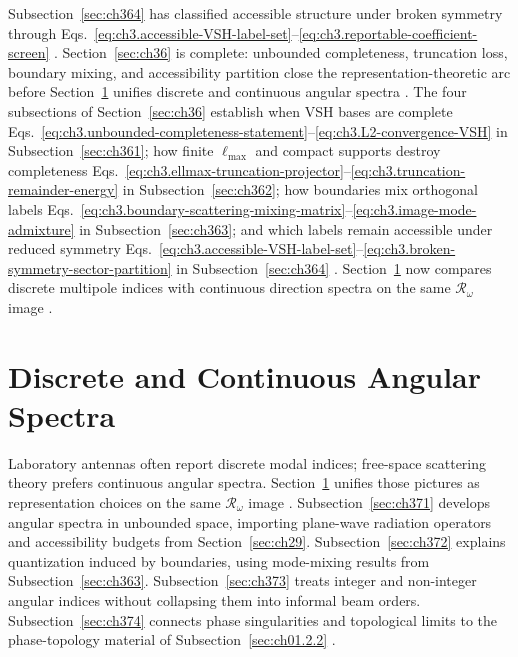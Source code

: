 Subsection~\ref{sec:ch364} has classified accessible structure under broken symmetry through
Eqs.~\eqref{eq:ch3.accessible-VSH-label-set}--\eqref{eq:ch3.reportable-coefficient-screen}
\cite{harrington2001}. Section~\ref{sec:ch36} is complete: unbounded completeness,
truncation loss, boundary mixing, and accessibility partition close the representation-theoretic arc before
Section~\ref{sec:ch37} unifies discrete and continuous angular spectra \cite{hansen1988}.
The four subsections of Section~\ref{sec:ch36} establish when VSH bases are complete
Eqs.~\eqref{eq:ch3.unbounded-completeness-statement}--\eqref{eq:ch3.L2-convergence-VSH} in Subsection~\ref{sec:ch361};
how finite \(\ell_{\max}\) and compact supports destroy completeness
Eqs.~\eqref{eq:ch3.ellmax-truncation-projector}--\eqref{eq:ch3.truncation-remainder-energy} in Subsection~\ref{sec:ch362};
how boundaries mix orthogonal labels Eqs.~\eqref{eq:ch3.boundary-scattering-mixing-matrix}--\eqref{eq:ch3.image-mode-admixture}
in Subsection~\ref{sec:ch363}; and which labels remain accessible under reduced symmetry
Eqs.~\eqref{eq:ch3.accessible-VSH-label-set}--\eqref{eq:ch3.broken-symmetry-sector-partition} in
Subsection~\ref{sec:ch364} \cite{stratton1941}. Section~\ref{sec:ch37} now compares
discrete multipole indices with continuous direction spectra on the same \(\mathcal{R}_\omega\) image
\cite{hansen1988}.
\section{Discrete and Continuous Angular Spectra}
\label{sec:ch37}
Laboratory antennas often report discrete modal indices; free-space scattering theory prefers continuous
angular spectra. Section~\ref{sec:ch37} unifies those pictures as representation choices on the same
\(\mathcal{R}_\omega\) image \cite{jackson1999}. Subsection~\ref{sec:ch371} develops angular
spectra in unbounded space, importing plane-wave radiation operators and accessibility budgets from
Section~\ref{sec:ch29}. Subsection~\ref{sec:ch372} explains quantization induced by boundaries, using
mode-mixing results from Subsection~\ref{sec:ch363}. Subsection~\ref{sec:ch373} treats integer and
non-integer angular indices without collapsing them into informal beam orders. Subsection~\ref{sec:ch374}
connects phase singularities and topological limits to the phase-topology material of
Subsection~\ref{sec:ch01.2.2} \cite{allen1992}.
